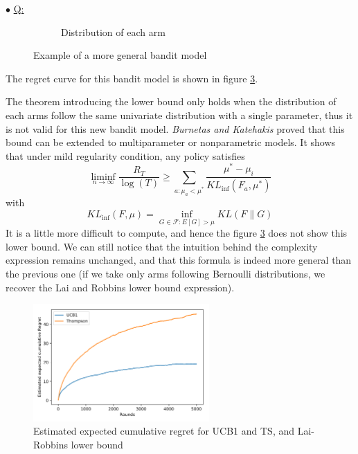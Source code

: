 \documentclass[a4paper, 11pt]{article}
\newcounter{cquestion}
\renewcommand{\thecquestion}{\arabic{cquestion}}
\newenvironment{question}
{\par \vspace{0.5em} \noindent \stepcounter{cquestion} \hspace{-1em}
 $\bullet$ \underline{Q\thecquestion :}}
{}
\begin{document}
\begin{question}
\begin{figure}[ht]
\begin{subfigure}[t]{0.35\textwidth}
      \caption{Distribution of each arm}\label{fig:ex1-bandit-general-pdf}
    \end{subfigure}
    \caption{Example of a more general bandit model}\label{fig:ex1-bandit-general}
  \end{figure}

  The regret curve for this bandit model is shown in figure
  \ref{fig:ex1-general-regret}.

  The theorem introducing the lower bound \cite{lairobbins85} only
  holds when the distribution of each arms follow the same univariate
  distribution with a single parameter, thus it is not valid for this
  new bandit model. \emph{Burnetas and Katehakis} \cite{burnetas96}
  proved that this bound can be extended to multiparameter or
  nonparametric models. It shows that under mild regularity condition,
  any policy satisfies
  \begin{equation*}
    \liminf_{n \to \infty} \dfrac{R_T}{\log{(T)}} \ge
    \sum_{a: \mu_a < \mu^*} \dfrac{\mu^* - \mu_i}{KL_{\inf}(F_a, \mu^*)}
  \end{equation*}
  with
  \begin{equation*}
    KL_{\inf}(F, \mu) = \inf_{G \in \mathcal{F}: E[G] > \mu} KL(F \| G)
  \end{equation*}
  It is a little more difficult to compute, and hence the figure
  \ref{fig:ex1-general-regret} does not show this lower bound. We can
  still notice that the intuition behind the complexity expression
  remains unchanged, and that this formula is indeed more general than
  the previous one (if we take only arms following Bernoulli
  distributions, we recover the Lai and Robbins lower bound
  expression).

  \begin{figure}[h]
    \centering
    \includegraphics[width=0.6\textwidth]{ex1_general_regret}
    \caption{Estimated expected cumulative regret for UCB1 and TS, and
      Lai-Robbins lower bound}\label{fig:ex1-general-regret}
  \end{figure}


\end{question}
\end{document}
